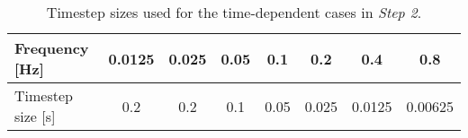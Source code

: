 \begin{table}[htb!]
    \caption{Timestep sizes used for the time-dependent cases in
    \textit{Step 2}.}
	\centering
	\setlength\tabcolsep{2.5pt}
	\begin{tabular}{l S S S S S S S}
	    \toprule
	    Frequency [Hz] & 0.0125 & 0.025 & 0.05 & 0.1 & 0.2 & 0.4 & 0.8 \\
	    \midrule
	    Timestep size [s] & 0.2 & 0.2 & 0.1 & 0.05 & 0.025 & 0.0125 & 0.00625
	    \\
	    \bottomrule
	\end{tabular}
	\label{table:timestep}
\end{table}